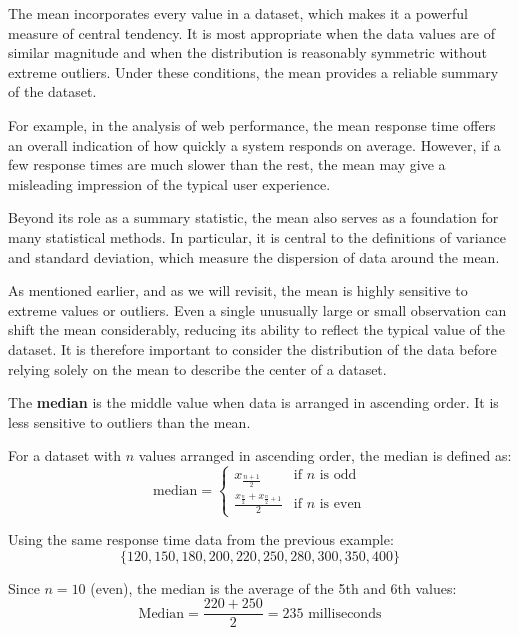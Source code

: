 The mean incorporates every value in a dataset, which makes it a powerful measure of central tendency. It is most appropriate when the data values are of similar magnitude and when the distribution is reasonably symmetric without extreme outliers. Under these conditions, the mean provides a reliable summary of the dataset.

For example, in the analysis of web performance, the mean response time offers an overall indication of how quickly a system responds on average. However, if a few response times are much slower than the rest, the mean may give a misleading impression of the typical user experience.

Beyond its role as a summary statistic, the mean also serves as a foundation for many statistical methods. In particular, it is central to the definitions of variance and standard deviation, which measure the dispersion of data around the mean.

\begin{remark}
    As mentioned earlier, and as we will revisit, the mean is highly sensitive to extreme values or outliers. Even a single unusually large or small observation can shift the mean considerably, reducing its ability to reflect the typical value of the dataset.
    It is therefore important to consider the distribution of the data before relying solely on the mean to describe the center of a dataset.
\end{remark}

The \textbf{median} is the middle value when data is arranged in ascending order. It is less sensitive to outliers than the mean.

\begin{definition}[Median]
    For a dataset with $n$ values arranged in ascending order, the median is defined as:
    \[
    \text{median} =
    \begin{cases}
        x_{\frac{n+1}{2}} & \text{if } n \text{ is odd} \\
        \frac{x_{\frac{n}{2}} + x_{\frac{n}{2}+1}}{2} & \text{if } n \text{ is even}
    \end{cases}
    \]
\end{definition}

\begin{example}\par

Using the same response time data from the previous example:
\[
\{120, 150, 180, 200, 220, 250, 280, 300, 350, 400\}
\]

Since $n = 10$ (even), the median is the average of the 5th and 6th values:
\[
\text{Median} = \frac{220 + 250}{2} = 235 \text{ milliseconds}
\]
\end{example}

